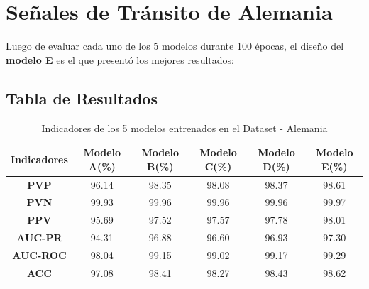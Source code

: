 		
	\section{Señales de Tránsito de Alemania}
		Luego de evaluar cada uno de los 5 modelos durante 100 épocas, el diseño del \underline{\bf modelo E} es el que presentó los mejores resultados:

		\subsection{Tabla de Resultados}


		\begin{table}[H]
			\begin{center}
			\caption{\small{Indicadores de los 5 modelos entrenados en el Dataset - Alemania}}
			\vspace{1.1em}
			\begin{tabular}{|c|c|c|c|c|c|}
			\cline{1-6}
			\textbf{Indicadores}    & \textbf{Modelo A(\%)} & \textbf{Modelo B(\%)} & \textbf{Modelo C(\%)} &\textbf{ Modelo D(\%)} & \textbf{Modelo E(\%)} \\ \hline
			\multicolumn{1}{|c|}{\textbf{PVP}}        & 96.14     & 98.35       & 98.08       & 98.37       & 98.61       \\ \hline
			\multicolumn{1}{|c|}{\textbf{PVN}}        & 99.93     & 99.96       & 99.96       & 99.96       & 99.97       \\ \hline
			\multicolumn{1}{|c|}{\textbf{PPV}}        & 95.69     & 97.52       & 97.57       & 97.78       & 98.01      \\ \hline
			\multicolumn{1}{|c|}{\textbf{AUC-PR}}     & 94.31     & 96.88       & 96.60       & 96.93       & 97.30       \\ \hline
			\multicolumn{1}{|c|}{\textbf{AUC-ROC}}    & 98.04     & 99.15       & 99.02       & 99.17       & 99.29       \\ \hline
			\multicolumn{1}{|c|}{\textbf{ACC}}        & 97.08     & 98.41       & 98.27       & 98.43       & 98.62       \\ \hline
			\end{tabular}
			\end{center}
		\end{table}

